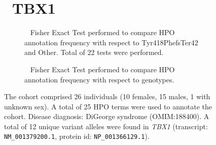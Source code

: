 \begin{figure}[htbp]
\section*{ TBX1}
\centering
\begin{subfigure}[b]{0.95\textwidth}
\centering
{}
\captionsetup{justification=raggedright,singlelinecheck=false}
\caption{         Fisher Exact Test performed to compare HPO annotation frequency with respect to Tyr418PhefsTer42 and Other. Total of
        22 tests were performed. }
\end{subfigure}
\vspace{2em}
\begin{subfigure}[b]{0.95\textwidth}
\centering
{}
\captionsetup{justification=raggedright,singlelinecheck=false}
\caption{             Fisher Exact Test performed to compare HPO annotation frequency with respect to genotypes. }
\end{subfigure}

\vspace{2em}

\caption{ The cohort comprised 26 individuals (10 females, 15 males, 1 with unknown sex). A total of 25 HPO terms were used to annotate the cohort. Disease diagnosis: DiGeorge syndrome (OMIM:188400).  A total of 12 unique variant alleles were found in \textit{TBX1} (transcript: \texttt{NM\_001379200.1}, protein id: \texttt{NP\_001366129.1}).}
\end{figure}
